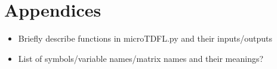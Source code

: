 \documentclass{article}
\begin{document}
\section*{Appendices}
\begin{itemize}
\item Briefly describe functions in microTDFL.py and their inputs/outputs
\item List of symbols/variable names/matrix names and their meanings?
\end{itemize}


\end{document}
